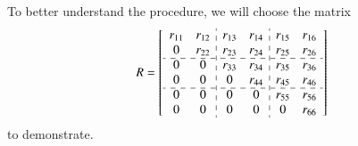 \documentclass[1p]{elsarticle}
\numberwithin{equation}{section}
\begin{document}
To better understand the procedure, we will choose the matrix 
\[R= \begin{bmatrix}
\begin{array}{cc:cc:cc}
 r_{11} & r_{12} & r_{13} & r_{14} & r_{15} & r_{16}\\
 0 & r_{22} & r_{23} & r_{24} & r_{25} & r_{26}\\
 \cdashline{1-6}
 0      & 0      & r_{33} & r_{34} & r_{35} & r_{36}\\
 0      & 0      & 0 & r_{44} & r_{45} & r_{46}\\
 \cdashline{1-6}
 0      & 0      & 0      & 0      & r_{55} & r_{56}\\
 0      & 0      & 0      & 0      & 0 & r_{66}\\
\end{array}
\end{bmatrix}
\]
to demonstrate. 
\end{document}

